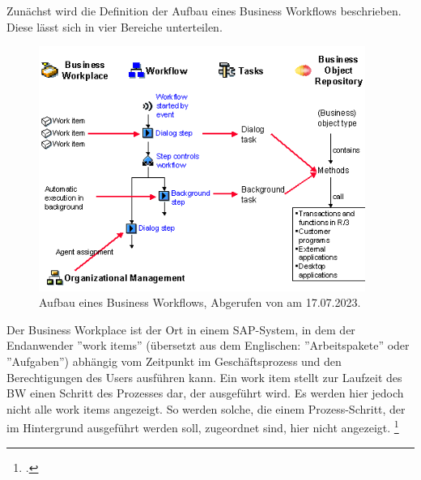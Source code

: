 Zunächst wird die Definition der Aufbau eines Business Workflows beschrieben. Diese lässt sich in vier Bereiche unterteilen.

\begin{figure}[H]
 \centering
 \includegraphics[height=8cm]{Bilder/Business-Workflows_Schema.png}
 \caption[Aufbau eines Business Workflows]{Aufbau eines Business Workflows, Abgerufen von \cite{sap_business-workflows_2022-1} am 17.07.2023.}
 \label{fig:iso_norm}
\end{figure}

Der Business Workplace ist der Ort in einem SAP-System, in dem der Endanwender ''work items'' (übersetzt aus dem Englischen: ''Arbeitspakete'' oder ''Aufgaben'') abhängig vom Zeitpunkt im Geschäftsprozess und den Berechtigungen des Users ausführen kann. Ein work item stellt zur Laufzeit des BW einen Schritt des Prozesses dar, der ausgeführt wird. Es werden hier jedoch nicht alle work items angezeigt. So werden \zB solche, die einem Prozess-Schritt, der im Hintergrund ausgeführt werden soll, zugeordnet sind, hier nicht angezeigt. \footcite[Vgl.][]{sap_business-workflows_2022-1}

